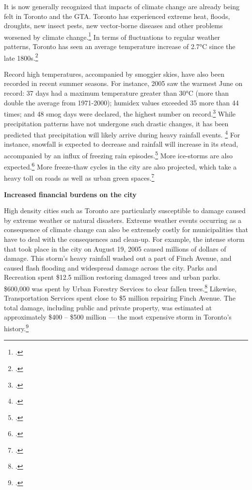 It is now generally recognized that impacts of climate change are already being felt in Toronto and the GTA.
Toronto has experienced extreme heat, floods, droughts, new insect pests, new vector-borne diseases and other problems worsened by climate change.\footcite[][]{TorontoAheadStorm}
In terms of fluctuations to regular weather patterns, Toronto has seen an average temperature increase of 2.7°C since the late 1800s.\footcite[][p. 5]{ScanCCToronto}



Record high temperatures, accompanied by smoggier skies, have also been recorded in recent summer seasons. 
For instance, 2005 saw the warmest June on record: 37 days had a maximum temperature greater than 30°C (more than double the average from 1971-2000); humidex values exceeded 35 more than 44 times; and 48 smog days were declared, the highest number on record.\footcite[][p. iii, p. 7]{ScanCCToronto}
While precipitation patterns have not undergone such drastic changes, it has been predicted that precipitation will likely arrive during heavy rainfall events. \footcite[][p. 6]{ScanCCToronto}
For instance, snowfall is expected to decrease and rainfall will increase in its stead, accompanied by an influx of freezing rain episodes.\footcite[][p. 8]{TorontoAheadStorm}
More ice-storms are also expected.\footcite[][]{FreezingRain2007}
More freeze-thaw cycles in the city are also projected, which take a heavy toll on roads as well as urban green spaces.\footcite[][p. 8]{TorontoAheadStorm}



\textbf{Increased financial burdens on the city}



High density cities such as Toronto are particularly susceptible to damage caused by extreme weather or natural disasters. 
Extreme weather events occurring as a consequence of climate change can also be extremely costly for municipalities that have to deal with the consequences and clean-up. 
For example, the intense storm that took place in the city on August 19, 2005 caused millions of dollars of damage. 
This storm's heavy rainfall washed out a part of Finch Avenue, and caused flash flooding and widespread damage across the city. 
Parks and Recreation spent \$12.5 million restoring damaged trees and urban parks. 
\$600,000 was spent by Urban Forestry Services to clear fallen trees.\footcite[][p. iii]{ScanCCToronto}
Likewise, Transportation Services spent close to \$5 million repairing Finch Avenue. 
The total damage, including public and private property, was estimated at approximately \$400 -- \$500 million --- the most expensive storm in Toronto's history.\footcite[][p. 11]{TorontoAheadStorm}




